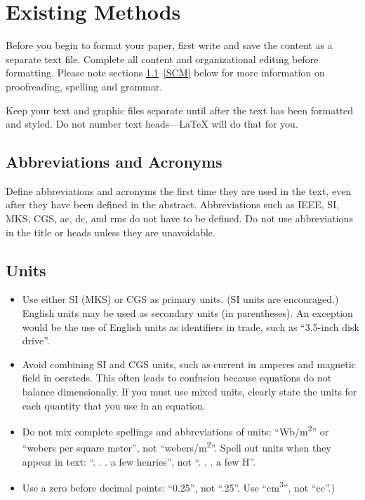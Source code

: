 \documentclass[conference]{IEEEtran}
\begin{document}
\section{Existing Methods}

Before you begin to format your paper, first write and save the content as a 
separate text file. Complete all content and organizational editing before 
formatting. Please note sections \ref{AA}--\ref{SCM} below for more information on 
proofreading, spelling and grammar.

Keep your text and graphic files separate until after the text has been 
formatted and styled. Do not number text heads---{\LaTeX} will do that 
for you.

\subsection{Abbreviations and Acronyms}\label{AA}
Define abbreviations and acronyms the first time they are used in the text, 
even after they have been defined in the abstract. Abbreviations such as 
IEEE, SI, MKS, CGS, ac, dc, and rms do not have to be defined. Do not use 
abbreviations in the title or heads unless they are unavoidable.

\subsection{Units}
\begin{itemize}
\item Use either SI (MKS) or CGS as primary units. (SI units are encouraged.) English units may be used as secondary units (in parentheses). An exception would be the use of English units as identifiers in trade, such as ``3.5-inch disk drive''.
\item Avoid combining SI and CGS units, such as current in amperes and magnetic field in oersteds. This often leads to confusion because equations do not balance dimensionally. If you must use mixed units, clearly state the units for each quantity that you use in an equation.
\item Do not mix complete spellings and abbreviations of units: ``Wb/m\textsuperscript{2}'' or ``webers per square meter'', not ``webers/m\textsuperscript{2}''. Spell out units when they appear in text: ``. . . a few henries'', not ``. . . a few H''.
\item Use a zero before decimal points: ``0.25'', not ``.25''. Use ``cm\textsuperscript{3}'', not ``cc''.)
\end{itemize}
\end{document}
